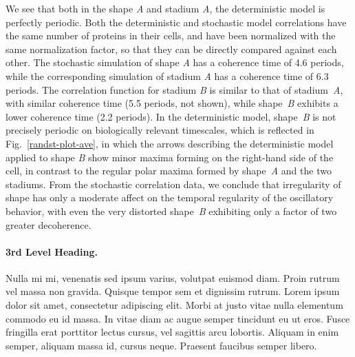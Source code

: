 \documentclass[10pt,letterpaper]{article}
\begin{document}

We see that both in the shape \emph{A} and stadium \emph{A}, the
deterministic model is perfectly periodic.  Both the deterministic and
stochastic model correlations have the same number of proteins in
their cells, and have been normalized with the same normalization
factor, so that they can be directly compared against each other.  The
stochastic simulation of shape \emph{A} has a coherence time of 4.6
periods, while the corresponding simulation of stadium \emph{A} has a
coherence time of 6.3 periods.
%
The correlation function for stadium \emph{B} is similar to that of
stadium~\emph{A}, with similar coherence time (5.5 periods, not
shown), while shape~\emph{B} exhibits a lower coherence time (2.2
periods).  In the deterministic model, shape~\emph{B} is not precisely
periodic on biologically relevant timescales, which is reflected in
Fig.~\ref{randst-plot-ave}, in which the arrows describing the
deterministic model applied to shape \emph{B} show minor maxima
forming on the right-hand side of the cell, in contrast to the regular
polar maxima formed by shape~\emph{A} and the two stadiums.
%
From the stochastic correlation data, we conclude that irregularity of
shape has only a moderate affect on the temporal regularity of the
oscillatory behavior, with even the very distorted shape~\emph{B}
exhibiting only a factor of two greater decoherence.

\paragraph{3rd Level Heading.} Nulla mi mi, venenatis sed ipsum varius, volutpat euismod diam. Proin rutrum vel massa non gravida. Quisque tempor sem et dignissim rutrum. Lorem ipsum dolor sit amet, consectetur adipiscing elit. Morbi at justo vitae nulla elementum commodo eu id massa. In vitae diam ac augue semper tincidunt eu ut eros. Fusce fringilla erat porttitor lectus cursus, vel sagittis arcu lobortis. Aliquam in enim semper, aliquam massa id, cursus neque. Praesent faucibus semper libero.
\end{document}

